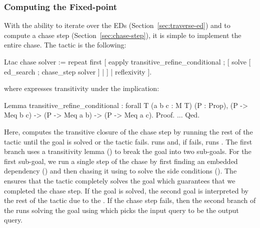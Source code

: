 \documentclass[preprint]{sigplanconf}
\newcommand{\ltac}[0]{\ensuremath{\mathcal{L}_{\mathrm{tac}}}}
\begin{document}
\subsubsection{Computing the Fixed-point}
With the ability to iterate over the EDs (Section~\ref{sec:traverse-ed}) and to compute a chase step (Section~\ref{sec:chase-step}), it is simple to implement the entire chase.
The tactic is the following:
\begin{coq}
Ltac chase solver :=
  repeat first
    [ eapply transitive_refine_conditional ;
      [ solve [ ed_search ; chase_step solver ]
      | ]
    | reflexivity ].
\end{coq}
where  expresses transitivity under the implication:
\begin{coq}
Lemma transitive_refine_conditional
: forall {T} (a b c : M T) (P : Prop),
   (P -> Meq b c) -> (P -> Meq a b) ->
   (P -> Meq a c).
Proof. ... Qed.
\end{coq}
Here,  computes the transitive closure of the chase step by running the rest of the tactic until the goal is solved or the tactic fails.
 runs  and, if  fails, runs .
The first branch uses a transitivity lemma () to break the goal into two sub-goals.
For the first sub-goal, we run a single step of the chase by first finding an embedded dependency () and then chasing it using  to solve the side conditions ().
The  ensures that the tactic completely solves the goal which guarantees that we completed the chase step.
If the goal is solved, the second goal is interpreted by the rest of the tactic due to the .
If the chase step fails, then the second branch of the  runs solving the goal using  which picks the input query to be the output query.

\end{document}
